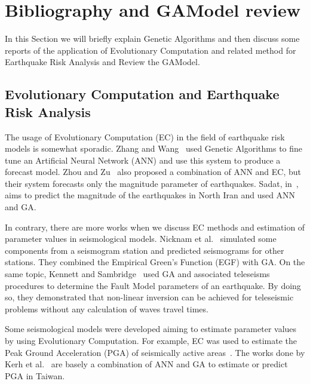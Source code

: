 \section{Bibliography and GAModel review}\label{estadoArte}
In this Section we will briefly explain Genetic Algorithms and then discuss some reports of the application of Evolutionary Computation and related method for Earthquake Risk Analysis and Review the GAModel.

\subsection{Evolutionary Computation and Earthquake Risk Analysis}

The usage of Evolutionary Computation (EC) in the field of earthquake risk models is somewhat sporadic. Zhang and Wang~\cite{Zhang2012} used Genetic Algorithms to fine tune an Artificial Neural Network (ANN) and use this system to produce a forecast model. Zhou and Zu~\cite{Feiyan2014} also proposed a combination of ANN and EC, but
their system forecasts only the magnitude parameter of earthquakes. Sadat, in~\cite{sadat2015application}, aims to predict the magnitude of the earthquakes in North Iran and used ANN and GA.

In contrary, there are more works when we discuss EC methods and estimation of parameter values in seismological models. Nicknam et al.~\cite{Nicknam2010} simulated some components from a seismogram station and predicted seismograms for other stations. They combined the Empirical Green’s Function (EGF) with GA. On the same topic, Kennett and Sambridge~\cite{Kennett1992} used GA and associated teleseisms procedures to determine the Fault Model parameters of an earthquake. By doing so, they demonstrated that non-linear inversion can be achieved for teleseismic problems without any calculation of waves travel times. %


Some seismological models were developed aiming to estimate parameter values by using Evolutionary Computation. For example, EC was used to estimate the Peak Ground Acceleration (PGA) of seismically active areas~\cite{Kermani2009,Cabalar2009,Kerh2010,Kerh2015}. 
The works done by Kerh et al.~\cite{Kerh2010, Kerh2015} are basely a combination of ANN and GA to estimate or predict PGA in Taiwan. %

